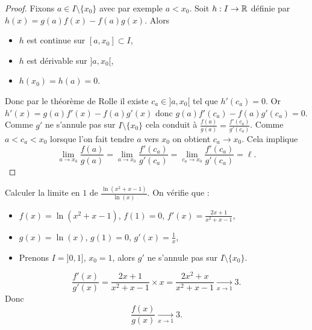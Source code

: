 \documentclass[class=report,crop=false]{standalone}
\begin{document}
\begin{proof}
Fixons $a\in I\setminus\{x_0\}$ avec par exemple $a<x_0$.
Soit $h : I \to \mathbb{R}$ définie par $h(x)=g(a)f(x)-f(a)g(x)$.
Alors
\begin{itemize}
  \item $h$ est continue sur $[a,x_0] \subset I$,
  \item $h$ est dérivable sur $]a,x_0[$,
  \item $h(x_0)=h(a)=0$.
\end{itemize}
Donc par le théorème de Rolle il existe $c_a \in ]a,x_0[$ tel que $h'(c_a)=0$.
Or $h'(x)=g(a)f'(x)-f(a)g'(x)$ donc $g(a)f'(c_a)-f(a)g'(c_a)=0$.
Comme $g'$ ne s'annule pas sur $I\setminus\{x_0\}$ cela conduit à
$\frac{f(a)}{g(a)}=\frac{f'(c_a)}{g'(c_a)}$.
Comme $a<c_a<x_0$ lorsque l'on fait tendre $a$ vers $x_0$ on obtient $c_a \to x_0$.
Cela implique
$$\lim_{a\to x_0} \frac{f(a)}{g(a)} = \lim_{a\to x_0} \frac{f'(c_a)}{g'(c_a)} = \lim_{c_a\to x_0} \frac{f'(c_a)}{g'(c_a)} = \ell.$$
\end{proof}

\begin{exemple}
Calculer la limite en $1$ de $\frac{\ln(x^2+x-1)}{\ln(x)}$.
On vérifie que :
\begin{itemize}
  \item $f(x)=\ln(x^2+x-1)$, $f(1)=0$, $f'(x)=\frac{2x+1}{x^2+x-1}$,
  \item $g(x)=\ln(x)$, $g(1)=0$, $g'(x)=\frac 1x$,
  \item Prenons $I=]0,1]$, $x_0=1$, alors $g'$ ne s'annule pas sur $I\setminus\{x_0\}$.
\end{itemize}


$$\frac{f'(x)}{g'(x)} = \frac{2x+1}{x^2+x-1} \times x = \frac{2x^2+x}{x^2+x-1} \xrightarrow[x\to 1]{} 3.$$
Donc
$$\frac{f(x)}{g(x)} \xrightarrow[x\to 1]{} 3.$$
\end{exemple}

\end{document}
